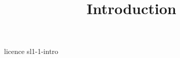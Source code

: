 \documentclass {beamer}
\title {Introduction}
\begin{document}
 {licence}
 {sl1-1-intro}
\end{document}
